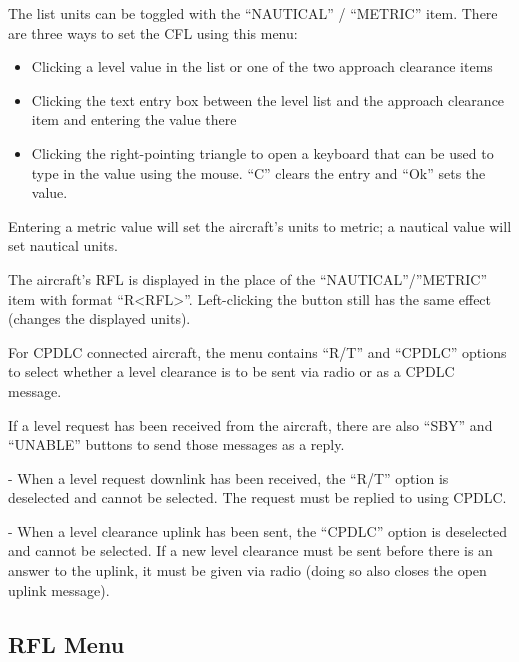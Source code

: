 \documentclass[a4paper,oneside,11pt]{memoir}
\newcommand\capdimage[2]{
\begin{center}
\hspace{1em}%
\vtop{%
\centering
\texttt{[image: \#1]}%
\captionof{figure}{#2}%
}%
\end{center}
\ignorespaces}
\begin{document}
\bigskip

The list units can be toggled with the “NAUTICAL” / “METRIC” item. There are three ways to set the CFL using this menu:

\bigskip

\begin{itemize}
        \item Clicking a level value in the list or one of the two approach clearance items
        \item Clicking the text entry box between the level list and the approach clearance item and entering the value there
        \item Clicking the right-pointing triangle to open a keyboard that can be used to type in the value using the mouse. “C” clears the entry and “Ok” sets the value.
\end{itemize}

\bigskip

Entering a metric value will set the aircraft’s units to metric; a nautical value will set nautical units.

\bigskip

The aircraft’s RFL is displayed in the place of the “NAUTICAL”/”METRIC” item with format “R<RFL>”. Left-clicking the button still has the same effect (changes the displayed units).

\capdimage{img/cfldl.png}{CPDLC CFL Menu}

For CPDLC connected aircraft, the menu contains “R/T” and “CPDLC” options to select whether a level clearance is to be sent via radio or as a CPDLC message.

\bigskip

If a level request has been received from the aircraft, there are also “SBY” and “UNABLE” buttons to send those messages as a reply.

\bigskip

- When a level request downlink has been received, the “R/T” option is deselected and cannot be selected. The request must be replied to using CPDLC.

\bigskip

- When a level clearance uplink has been sent, the “CPDLC” option is deselected and cannot be selected. If a new level clearance must be sent before there is an answer to the uplink, it must be given via radio (doing so also closes the open uplink message).

\subsection{RFL Menu}
\label{menu:rfl}
\end{document}
